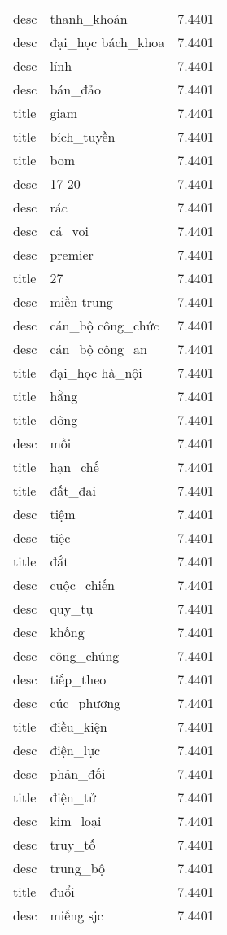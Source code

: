 \documentclass{article}
\begin{document}
\begin{tabular}{lll}
desc & thanh\_khoản & 7.4401\\
desc & đại\_học bách\_khoa & 7.4401\\
desc & lính & 7.4401\\
desc & bán\_đảo & 7.4401\\
title & giam & 7.4401\\
title & bích\_tuyền & 7.4401\\
title & bom & 7.4401\\
desc & 17 20 & 7.4401\\
desc & rác & 7.4401\\
desc & cá\_voi & 7.4401\\
desc & premier & 7.4401\\
title & 27 & 7.4401\\
desc & miền trung & 7.4401\\
desc & cán\_bộ công\_chức & 7.4401\\
desc & cán\_bộ công\_an & 7.4401\\
title & đại\_học hà\_nội & 7.4401\\
title & hằng & 7.4401\\
title & dông & 7.4401\\
desc & mồi & 7.4401\\
title & hạn\_chế & 7.4401\\
title & đất\_đai & 7.4401\\
desc & tiệm & 7.4401\\
desc & tiệc & 7.4401\\
title & đắt & 7.4401\\
desc & cuộc\_chiến & 7.4401\\
desc & quy\_tụ & 7.4401\\
desc & khống & 7.4401\\
desc & công\_chúng & 7.4401\\
desc & tiếp\_theo & 7.4401\\
desc & cúc\_phương & 7.4401\\
title & điều\_kiện & 7.4401\\
desc & điện\_lực & 7.4401\\
desc & phản\_đối & 7.4401\\
title & điện\_tử & 7.4401\\
desc & kim\_loại & 7.4401\\
desc & truy\_tố & 7.4401\\
desc & trung\_bộ & 7.4401\\
title & đuổi & 7.4401\\
desc & miếng sjc & 7.4401\\

\end{tabular}
\end{document}
